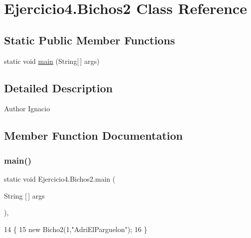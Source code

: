 \hypertarget{class_ejercicio4_1_1_bichos2}{}\section{Ejercicio4.\+Bichos2 Class Reference}
\label{class_ejercicio4_1_1_bichos2}
\subsection*{Static Public Member Functions}
\begin{DoxyCompactItemize}
\item 
static void \mbox{\hyperlink{class_ejercicio4_1_1_bichos2_a5595846a1336eb1858d392b78b96a42f}{main}} (String\mbox{[}$\,$\mbox{]} args)
\end{DoxyCompactItemize}


\subsection{Detailed Description}
\begin{DoxyAuthor}{Author}
Ignacio 
\end{DoxyAuthor}


\subsection{Member Function Documentation}
\mbox{\label{class_ejercicio4_1_1_bichos2_a5595846a1336eb1858d392b78b96a42f}} 
\subsubsection{\texorpdfstring{main()}{main()}}
{\footnotesize\ttfamily static void Ejercicio4.\+Bichos2.\+main (\begin{DoxyParamCaption}\item[{String \mbox{[}$\,$\mbox{]}}]{args }\end{DoxyParamCaption})\hspace{0.3cm}{\ttfamily [inline]}, {\ttfamily [static]}}


\begin{DoxyCode}
14                                           \{
15         \textcolor{keyword}{new} Bicho2(1,\textcolor{stringliteral}{"AdriElParguelon"});
16     \}
\end{DoxyCode}
